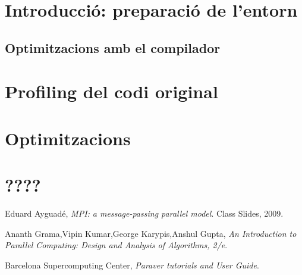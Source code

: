 \documentclass[final,a4paper,11pt]{report}
\begin{document}


\tableofcontents
\newpage


\section{Introducció: preparació de l'entorn}

\subsection{Optimitzacions amb el compilador}

\section{Profiling del codi original}


\section{Optimitzacions}


\section{????}

\begin{thebibliography}{9}

  Eduard Ayguadé,
  \emph{MPI: a message-passing parallel model}.
  Class Slides,
  2009.

  Ananth Grama,Vipin Kumar,George Karypis,Anshul Gupta,
  \emph{An Introduction to Parallel Computing: Design and Analysis of Algorithms, 2/e}.

  Barcelona Supercomputing Center,
  \emph{Paraver tutorials and User Guide}.

\end{thebibliography}
\end{document}
